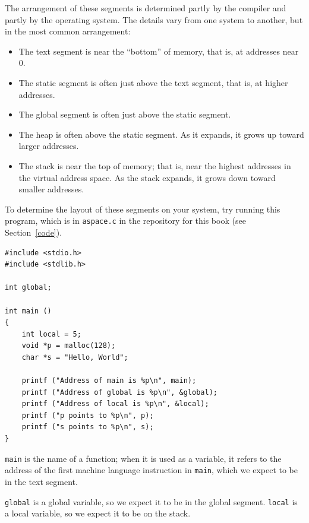 \documentclass[12pt]{book}
\begin{document}
The arrangement of these segments is determined partly by the 
compiler and partly by the operating system.  The details vary
from one system to another, but in the most common arrangement:

\begin{itemize}

\item The text segment is near the ``bottom'' of memory, that is,
  at addresses near 0.

\item The static segment is often just above the text segment, that is,
at higher addresses.

\item The global segment is often just above the static segment.

\item The heap is often above the static segment.  As it expands,
  it grows up toward larger addresses.
  
\item The stack is near the top of memory; that is, near the
  highest addresses in the virtual address space.  As the
  stack expands, it grows down toward smaller addresses.

\end{itemize}


To determine the layout of these segments on your system, try running
this program, which is in {\tt aspace.c} in the repository for this
book (see Section~\ref{code}).

\begin{verbatim}
#include <stdio.h>
#include <stdlib.h>

int global;

int main ()
{
    int local = 5;
    void *p = malloc(128);
    char *s = "Hello, World";

    printf ("Address of main is %p\n", main);
    printf ("Address of global is %p\n", &global);
    printf ("Address of local is %p\n", &local);
    printf ("p points to %p\n", p);
    printf ("s points to %p\n", s);
}
\end{verbatim}

{\tt main} is the name of a function; when it is used as a variable,
it refers to the address of the first machine language instruction
in {\tt main}, which we expect to be in the text segment.

{\tt global} is a global variable, so we expect it to be in the
global segment.  {\tt local} is a local variable, so we expect it
to be on the stack.
\end{document}
